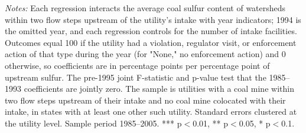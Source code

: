 \begin{table}[htbp]
{}
\begin{minipage}{\linewidth}
\vspace{4pt}
\footnotesize
\raggedright
\textit{Notes:} Each regression interacts the average coal sulfur content of watersheds within two flow steps upstream of the utility's intake with year indicators; 1994 is the omitted year, and each regression controls for the number of intake facilities. Outcomes equal 100 if the utility had a violation, regulator visit, or enforcement action of that type during the year (for "None," no enforcement action) and 0 otherwise, so coefficients are in percentage points per percentage point of upstream sulfur. The pre-1995 joint F-statistic and p-value test that the 1985--1993 coefficients are jointly zero. The sample is utilities with a coal mine within two flow steps upstream of their intake and no coal mine colocated with their intake, in states with at least one other such utility. Standard errors clustered at the utility level. Sample period 1985--2005. *** p$<$0.01, ** p$<$0.05, * p$<$0.1.
\end{minipage}
\end{table}
